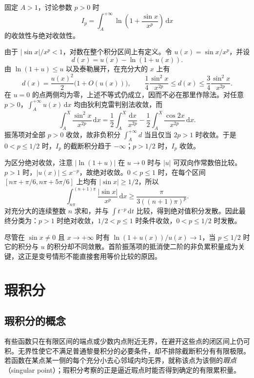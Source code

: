 \begin{example}
\label{ex:oscillatory-log-improper-integral}
固定 $A>1$，讨论参数 $p>0$ 时
\[
    I_p=\int_A^{+\infty}\ln\left(1+\frac{\sin x}{x^p}\right)\,\mathrm{d}x
\]
的收敛性与绝对收敛性。
\end{example}

\begin{solve}
由于 $|\sin x|/x^p<1$，对数在整个积分区间上有定义。令 $u(x)=\sin x/x^p$，并设
\[
    d(x)=u(x)-\ln(1+u(x)).
\]
由 $\ln(1+u)\leq u$ 以及泰勒展开，在充分大的 $x$ 上有
\[
    d(x)=\frac{u(x)^2}{2}\bigl(1+O(u(x))\bigr),\qquad
    \frac14\frac{\sin^2x}{x^{2p}}
    \leq d(x)\leq\frac34\frac{\sin^2x}{x^{2p}}.
\]
在 $u=0$ 的点两侧均为零，上述不等式仍成立，因而不必在那里作除法。对任意 $p>0$，$\int_A^{+\infty}u(x)\,\mathrm{d}x$ 均由狄利克雷判别法收敛，而
\[
    \int_A^X\frac{\sin^2x}{x^{2p}}\,\mathrm{d}x
    =\frac12\int_A^X\frac{\mathrm{d}x}{x^{2p}}
     -\frac12\int_A^X\frac{\cos2x}{x^{2p}}\,\mathrm{d}x.
\]
振荡项对全部 $p>0$ 收敛，故非负积分 $\int_A^{+\infty}d$ 当且仅当 $2p>1$ 时收敛。于是 $0<p\leq1/2$ 时，$I_p$ 的截断积分趋于 $-\infty$；$p>1/2$ 时，$I_p$ 收敛。

为区分绝对收敛，注意 $|\ln(1+u)|$ 在 $u\to0$ 时与 $|u|$ 可双向作常数倍比较。$p>1$ 时，$|u(x)|\leq x^{-p}$，故绝对收敛。$0<p\leq1$ 时，在每个区间 $[n\pi+\pi/6,n\pi+5\pi/6]$ 上均有 $|\sin x|\geq1/2$，所以
\[
    \int_{n\pi}^{(n+1)\pi}\frac{|\sin x|}{x^p}\,\mathrm{d}x
    \geq\frac{\pi}{3((n+1)\pi)^p}.
\]
对充分大的连续整数 $n$ 求和，并与 $\int t^{-p}\,\mathrm{d}t$ 比较，得到绝对值积分发散。因此最终分类为：$p>1$ 时绝对收敛，$1/2<p\leq1$ 时条件收敛，$0<p\leq1/2$ 时发散。

尽管在 $\sin x\neq0$ 且 $x\to+\infty$ 时有 $\ln(1+u(x))/u(x)\to1$，当 $p\leq1/2$ 时它的积分与 $u$ 的积分却不同敛散。首阶振荡项的抵消使二阶的非负累积量成为关键，这正是变号情形不能直接套用等价比较的原因。
\end{solve}

\section{瑕积分}
\label{sec:singular-integrals}

\subsection{瑕积分的概念}
\label{subsec:concept-of-singular-integrals}

有些函数只在有限区间的端点或少数内点附近无界，在避开这些点的闭区间上仍可积。无界性使它不满足普通黎曼积分的必要条件，却不排除截断积分有有限极限。若函数在某点某一侧的每个充分小去心邻域内均无界，就称该点为该侧的\emph{瑕点}（singular point）；瑕积分考察的正是逼近瑕点时能否得到确定的有限累积量。

